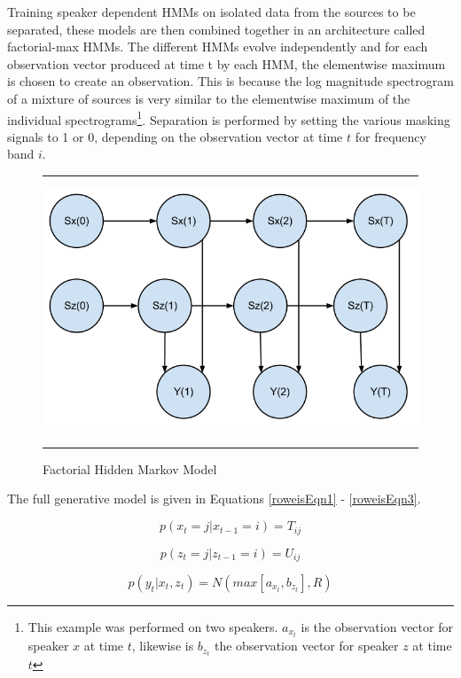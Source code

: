 \documentclass[11pt, oneside, a4paper]{report}
\begin{document}
Training speaker dependent HMMs on isolated data from the sources to be separated, these models are then combined together in an architecture called factorial-max HMMs. The different HMMs evolve independently and for each observation vector produced at time t by each HMM, the elementwise maximum is chosen to create an observation. This is because the log magnitude spectrogram of a mixture of sources is very similar to the elementwise maximum of the individual spectrograms\footnote{This example was performed on two speakers. $a_{x_{t}}$ is the observation vector for speaker $x$ at time $t$, likewise is $b_{z_{t}}$ the observation vector for speaker $z$ at time $t$}. Separation is performed by setting the various masking signals to 1 or 0, depending on the observation vector at time $t$ for frequency band $i$.

\begin{figure}[h]
  \centering
  \hrule
  \includegraphics[width = .9\textwidth]{f_hmm}
  \hrule
  \caption{Factorial Hidden Markov Model}
  \label{fhmm_figure}
\end{figure}

The full generative model is given in Equations \ref{roweisEqn1} - \ref{roweisEqn3}.

\begin{equation}\label{roweisEqn1}
  p(x_{t}=j|x_{t-1}=i)=T_{ij}
\end{equation}

\begin{equation}\label{roweisEqn2}
  p(z_{t}=j|z_{t-1}=i)=U_{ij}  
\end{equation}

\begin{equation}\label{roweisEqn3}
  p(y_{t}|x_{t},z_{t})=N(max[a_{x_{t}},b_{z_{t}}], R)  
\end{equation}
\end{document}
